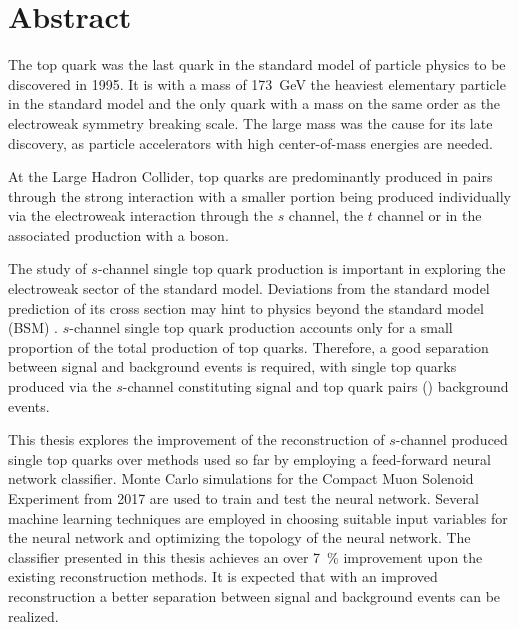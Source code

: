 \chapter*{Abstract}

The top quark was the last quark in the standard model of particle physics to be discovered in 1995. It is with a mass of \SI{173}{GeV} the heaviest elementary particle in the standard model and the only quark with a mass on the same order as the electroweak symmetry breaking scale. The large mass was the cause for its late discovery, as particle accelerators with high center-of-mass energies are needed.

At the Large Hadron Collider, top quarks are predominantly produced in pairs through the strong interaction with a smaller portion being produced individually via the electroweak interaction through the $s$ channel, the $t$ channel or in the associated production with a \PW boson.

The study of $s$-channel single top quark production is important in exploring the electroweak sector of the standard model. Deviations from the standard model prediction of its cross section may hint to physics beyond the standard model (BSM) \cite{CMS16}. $s$-channel single top quark production accounts only for a small proportion of the total production of top quarks. Therefore, a good separation between signal and background events is required, with single top quarks produced via the $s$-channel constituting signal and top quark pairs (\PtopNOSPACE\APtop) background events. 

This thesis explores the improvement of the reconstruction of $s$-channel produced single top quarks over methods used so far by employing a feed-forward neural network classifier. Monte Carlo simulations for the Compact Muon Solenoid Experiment from 2017 are used to train and test the neural network. Several machine learning techniques are employed in choosing suitable input variables for the neural network and optimizing the topology of the neural network. The classifier presented in this thesis achieves an over \SI{7}{\%} improvement upon the existing reconstruction methods. It is expected that with an improved reconstruction a better separation between signal and background events can be realized.